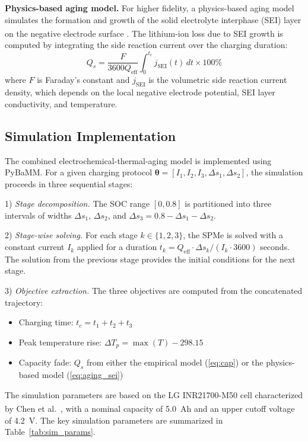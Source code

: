\documentclass[lettersize,journal]{IEEEtran}
\let\OLDcite\cite
\renewcommand{\cite}[1]{\textsuperscript{\OLDcite{#1}}}
\begin{document}
\textbf{Physics-based aging model.} For higher fidelity, a physics-based aging model simulates the formation and growth of the solid electrolyte interphase (SEI) layer on the negative electrode surface \cite{ref26}. The lithium-ion loss due to SEI growth is computed by integrating the side reaction current over the charging duration:
\begin{equation}
\label{eq:aging_sei}
Q_s = \frac{F}{3600 Q_{\text{eff}}} \int_0^{t_c} j_{\text{SEI}}(t) \, dt \times 100\%
\end{equation}
where $F$ is Faraday's constant and $j_{\text{SEI}}$ is the volumetric side reaction current density, which depends on the local negative electrode potential, SEI layer conductivity, and temperature.

\subsection{Simulation Implementation}

The combined electrochemical-thermal-aging model is implemented using PyBaMM. For a given charging protocol $\boldsymbol{\theta} = [I_1, I_2, I_3, \Delta s_1, \Delta s_2]$, the simulation proceeds in three sequential stages:

1) \textit{Stage decomposition.} The SOC range $[0, 0.8]$ is partitioned into three intervals of widths $\Delta s_1$, $\Delta s_2$, and $\Delta s_3 = 0.8 - \Delta s_1 - \Delta s_2$.

2) \textit{Stage-wise solving.} For each stage $k \in \{1, 2, 3\}$, the SPMe is solved with a constant current $I_k$ applied for a duration $t_k = Q_{\text{eff}} \cdot \Delta s_k / (I_k \cdot 3600)$ seconds. The solution from the previous stage provides the initial conditions for the next stage.

3) \textit{Objective extraction.} The three objectives are computed from the concatenated trajectory:
\begin{itemize}
\item Charging time: $t_c = t_1 + t_2 + t_3$
\item Peak temperature rise: $\Delta T_p = \max(T) - 298.15$
\item Capacity fade: $Q_s$ from either the empirical model (\ref{eq:cap}) or the physics-based model (\ref{eq:aging_sei})
\end{itemize}

The simulation parameters are based on the LG INR21700-M50 cell characterized by Chen et al.\ \cite{ref_chen2020}, with a nominal capacity of 5.0~Ah and an upper cutoff voltage of 4.2~V. The key simulation parameters are summarized in Table~\ref{tab:sim_params}.
\end{document}

